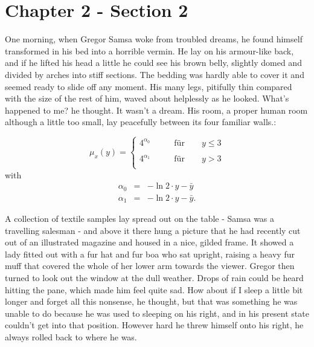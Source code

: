 \section{Chapter 2 - Section 2}
\label{Chapter_2_-_Section_2}
%
One morning, when Gregor Samsa woke from troubled dreams, he found himself transformed in his bed into a horrible vermin. He lay on his armour-like back, and if he lifted his head a little he could see his brown belly, slightly domed and divided by arches into stiff sections. The bedding was hardly able to cover it and seemed ready to slide off any moment. His many legs, pitifully thin compared with the size of the rest of him, waved about helplessly as he looked. What's happened to me? he thought. It wasn't a dream. His room, a proper human room although a little too small, lay peacefully between its four familiar walls.:


    \begin{equation}
        \label{equation_1}
        \mu_{x}(y) = \left\{ \begin{array}{lll}
        4^{\alpha_0} & \qquad \textrm{für} \qquad y \leq 3\\
        \\
        4^{\alpha_1} & \qquad \textrm{für} \qquad y > 3\\
        \end{array} \right.
    \end{equation}
    with
    \begin{eqnarray}
        \label{equation_2}
        \alpha_0 & = & -\ln 2 \cdot y - \bar{y}\\
        \alpha_1 & = & -\ln 2 \cdot y - \bar{y}\textrm{.}
    \end{eqnarray}



A collection of textile samples lay spread out on the table - Samsa was a travelling salesman - and above it there hung a picture that he had recently cut out of an illustrated magazine and housed in a nice, gilded frame. It showed a lady fitted out with a fur hat and fur boa who sat upright, raising a heavy fur muff that covered the whole of her lower arm towards the viewer. Gregor then turned to look out the window at the dull weather. Drops of rain could be heard hitting the pane, which made him feel quite sad. How about if I sleep a little bit longer and forget all this nonsense, he thought, but that was something he was unable to do because he was used to sleeping on his right, and in his present state couldn't get into that position. However hard he threw himself onto his right, he always rolled back to where he was.

